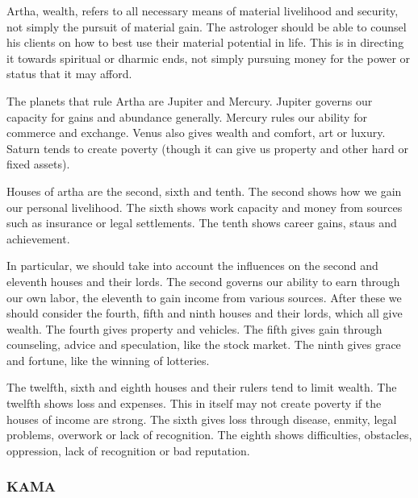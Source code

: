  

Artha, wealth, refers to all necessary means of material livelihood and security, not simply the pursuit of material gain. The astrologer should be able to counsel his clients on how to best use their material potential in life. This is in directing it towards spiritual or dharmic ends, not simply pursuing money for the power or status that it may afford.

 

 


 

The planets that rule Artha are Jupiter and Mercury. Jupiter governs our capacity for gains and abundance generally. Mercury rules our ability for commerce and exchange. Venus also gives wealth and comfort, art or luxury. Saturn tends to create poverty (though it can give us property and other hard or fixed assets).

 

Houses of artha are the second, sixth and tenth. The second shows how we gain our personal livelihood. The sixth shows work capacity and money from sources such as insurance or legal settlements. The tenth shows career gains, staus and achievement.

 

In particular, we should take into account the influences on the second and eleventh houses and their lords. The second governs our ability to earn through our own labor, the eleventh to gain income from various sources. After these we should consider the fourth, fifth and ninth houses and their lords, which all give wealth. The fourth gives property and vehicles. The fifth gives gain through counseling, advice and speculation, like the stock market. The ninth gives grace and fortune, like the winning of lotteries.

 

The twelfth, sixth and eighth houses and their rulers tend to limit wealth. The twelfth shows loss and expenses. This in itself may not create poverty if the houses of income are strong. The sixth gives loss through disease, enmity, legal problems, overwork or lack of recognition. The eighth shows difficulties, obstacles, oppression, lack of recognition or bad reputation.

 

 

\subsubsection{KAMA}

